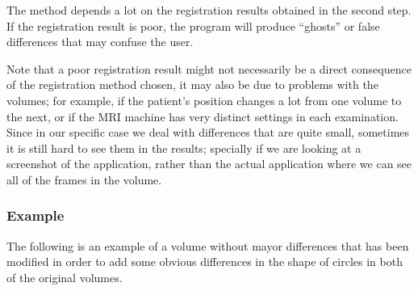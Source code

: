 The method depends a lot on the registration results obtained in the
second step. If the registration result is poor, the program will
produce ``ghosts'' or false differences that may confuse the user.

Note that a poor registration result might not necessarily be a direct
consequence of the registration method chosen, it may also be due to
problems with the volumes; for example, if the patient's position
changes a lot from one volume to the next, or if the MRI machine has
very distinct settings in each examination.\\

Since in our specific case we deal with differences that are quite
small, sometimes it is still hard to see them in the results;
specially if we are looking at a screenshot of the application, rather
than the actual application where we can see all of the frames in the
volume.

\subsubsection{Example}
The following is an example of a volume without mayor differences that
has been modified in order to add some obvious differences in the
shape of circles in both of the original volumes.

